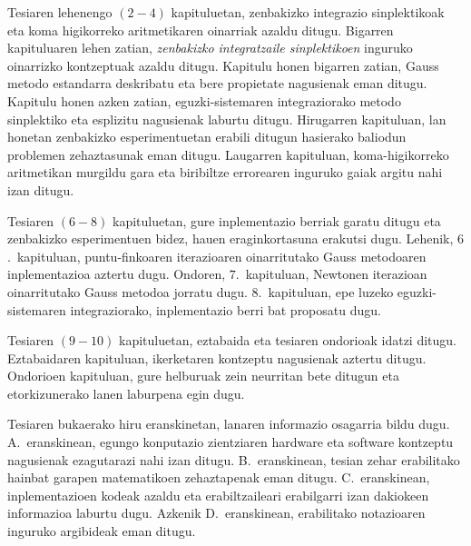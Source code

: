 Tesiaren lehenengo $(2-4)$ kapituluetan, zenbakizko integrazio sinplektikoak eta koma higikorreko aritmetikaren oinarriak azaldu ditugu. Bigarren kapituluaren lehen zatian, \emph{zenbakizko integratzaile sinplektikoen} inguruko oinarrizko kontzeptuak azaldu ditugu. Kapitulu honen bigarren zatian, Gauss metodo estandarra deskribatu eta bere propietate nagusienak eman ditugu. Kapitulu honen azken zatian, eguzki-sistemaren integraziorako metodo sinplektiko eta esplizitu nagusienak laburtu ditugu. Hirugarren kapituluan, lan honetan zenbakizko esperimentuetan erabili ditugun hasierako baliodun problemen zehaztasunak eman ditugu. Laugarren kapituluan, koma-higikorreko aritmetikan murgildu gara eta biribiltze errorearen inguruko gaiak argitu nahi izan ditugu.

Tesiaren $(6-8)$ kapituluetan, gure inplementazio berriak garatu ditugu eta zenbakizko esperimentuen bidez, hauen eraginkortasuna erakutsi dugu. Lehenik, $6$.~kapituluan, puntu-finkoaren iterazioaren oinarritutako Gauss metodoaren inplementazioa aztertu dugu. Ondoren, $7$.~kapituluan, Newtonen iterazioan oinarritutako Gauss metodoa jorratu dugu. $8$.~kapituluan, epe luzeko eguzki-sistemaren integraziorako, inplementazio berri bat proposatu dugu.  

Tesiaren $(9-10)$ kapituluetan, eztabaida eta tesiaren ondorioak idatzi ditugu. Eztabaidaren kapituluan, ikerketaren kontzeptu nagusienak aztertu ditugu. Ondorioen kapituluan, gure helburuak zein neurritan bete ditugun eta etorkizunerako lanen laburpena egin dugu. 

Tesiaren bukaerako hiru eranskinetan, lanaren informazio osagarria bildu dugu. A.~eranskinean, egungo konputazio zientziaren hardware eta software kontzeptu nagusienak ezagutarazi nahi izan ditugu. B.~eranskinean, tesian zehar erabilitako hainbat garapen matematikoen zehaztapenak eman ditugu. C.~eranskinean, inplementazioen kodeak azaldu eta erabiltzaileari erabilgarri izan dakiokeen informazioa laburtu dugu. Azkenik D.~eranskinean, erabilitako notazioaren inguruko argibideak eman ditugu.

      
      

